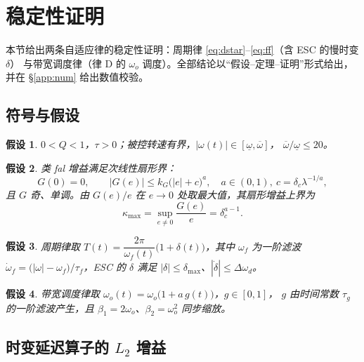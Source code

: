 \documentclass[UTF8,fontset=windows,a4paper,11pt]{ctexart}
\newtheorem{assumption}{假设}
\begin{document}
\section{稳定性证明}
\label{app:stab}

本节给出两条自适应律的稳定性证明：周期律 \eqref{eq:dstar}--\eqref{eq:ff}（含 ESC 的慢时变 $\delta$）
与带宽调度律（律 D 的 $\omega_o$ 调度）。全部结论以“假设--定理--证明”形式给出，
并在 \S\ref{app:num} 给出数值校验。

\subsection{符号与假设}

\begin{assumption}\label{A1}
$0<Q<1$，$\tau>0$；被控转速有界，$|\omega(t)|\in[\underline{\omega},\overline{\omega}]$，
$\overline{\omega}/\underline{\omega}\le 20$。
\end{assumption}

\begin{assumption}\label{A2}
类 fal 增益满足次线性扇形界：
\begin{equation}
G(0)=0,\qquad \big|G(e)\big|\le k_G\big(|e|+c\big)^{a},\quad a\in(0,1),\ c=\delta_c\lambda^{-1/a},
\end{equation}
且 $G$ 奇、单调。由 $G(e)/e$ 在 $e\to0$ 处取最大值，其扇形增益上界为
\begin{equation}
\kappa_{\max}=\sup_{e\ne0}\frac{G(e)}{e}=\delta_c^{a-1}.
\label{eq:kappa}
\end{equation}
\end{assumption}

\begin{assumption}\label{A3}
周期律取 $T(t)=\dfrac{2\pi}{\omega_f(t)}\big(1+\delta(t)\big)$，其中 $\omega_f$ 为一阶滤波
$\dot\omega_f=\big(|\omega|-\omega_f\big)/\tau_f$，ESC 的 $\delta$ 满足
$|\delta|\le\delta_{\max}$、$|\dot\delta|\le\Delta\omega_d$。
\end{assumption}

\begin{assumption}\label{A4}
带宽调度律取 $\omega_o(t)=\omega_o\big(1+a\,g(t)\big)$，$g\in[0,1]$，
$g$ 由时间常数 $\tau_g$ 的一阶滤波产生，且 $\beta_1=2\omega_o$、$\beta_2=\omega_o^2$ 同步缩放。
\end{assumption}

\subsection{时变延迟算子的 $L_2$ 增益}
\end{document}
